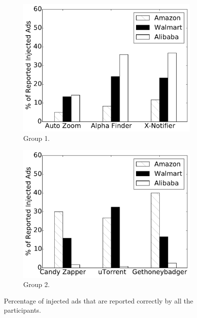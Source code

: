 \begin{figure}[t]
    \centering
    \begin{subfigure}[t]{0.48\textwidth}
        \includegraphics[width=\textwidth]{adinjection/figures/user_study/user_study_1}
        \caption{\scriptsize{Group 1.}}
        \label{adinjection:fig:eval:user_study:1}
    \end{subfigure}
    \hfill
    \begin{subfigure}[t]{0.48\textwidth}
        \includegraphics[width=\textwidth]{adinjection/figures/user_study/user_study_2}
        \caption{\scriptsize{Group 2.}}
        \label{adinjection:fig:eval:user_study:2}
    \end{subfigure}
    \caption{Percentage of injected ads that are reported correctly by all the participants.}
    \label{adinjection:fig:eval:extensions_adinjection}
\end{figure}
